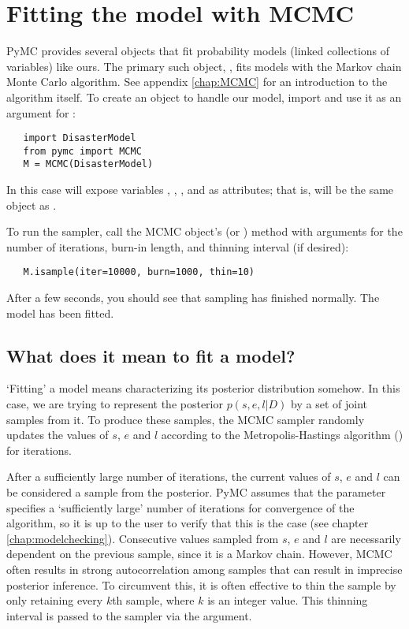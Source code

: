 \section{Fitting the model with MCMC}

PyMC provides several objects that fit probability models (linked collections of variables) like ours. The primary such object, , fits models with the Markov chain Monte Carlo algorithm. See appendix \ref{chap:MCMC} for an introduction to the algorithm itself. To create an  object to handle our model, import  and use it as an argument for :
\begin{verbatim}
   import DisasterModel
   from pymc import MCMC
   M = MCMC(DisasterModel)
\end{verbatim}
In this case  will expose variables , , ,  and  as attributes; that is,  will be the same object as .

To run the sampler, call the MCMC object's  (or ) method with arguments for the number of iterations, burn-in length, and thinning interval (if desired):
\begin{verbatim}
   M.isample(iter=10000, burn=1000, thin=10)
\end{verbatim}
After a few seconds, you should see that sampling has finished normally. The model has been fitted.

\subsection{What does it mean to fit a model?}

`Fitting' a model means characterizing its posterior distribution somehow. In this case, we are trying to represent the posterior $p(s,e,l|D)$ by a set of joint samples from it. To produce these samples, the MCMC sampler randomly updates the values of $s$, $e$ and $l$ according to the Metropolis-Hastings algorithm (\cite{gelman}) for   iterations.

After a sufficiently large number of iterations, the current values of $s$, $e$ and $l$ can be considered a sample from the posterior. PyMC assumes that the  parameter specifies a `sufficiently large' number of iterations for convergence of the algorithm, so it is up to the user to verify that this is the case (see chapter \ref{chap:modelchecking}). Consecutive values sampled from $s$, $e$ and $l$ are necessarily dependent on the previous sample, since it is a Markov chain. However, MCMC often results in strong autocorrelation among samples that can result in imprecise posterior inference. To circumvent this, it is often effective to thin the sample by only retaining every $k$th sample, where $k$ is an integer value. This thinning interval is passed to the sampler via the  argument.

